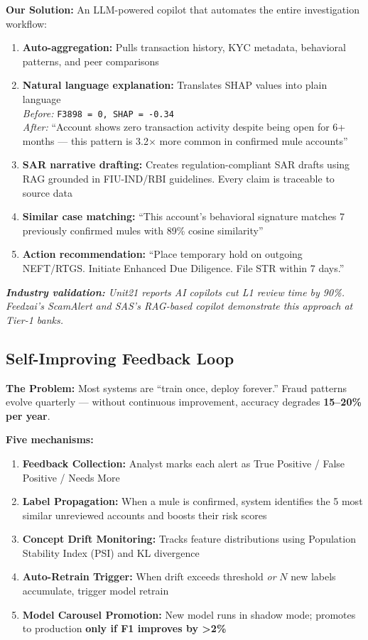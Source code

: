 \documentclass[11pt, a4paper]{article}
\begin{document}
\textbf{Our Solution:} An LLM-powered copilot that automates the entire investigation workflow:

\begin{enumerate}
    \item \textbf{Auto-aggregation:} Pulls transaction history, KYC metadata, behavioral patterns, and peer comparisons
    \item \textbf{Natural language explanation:} Translates SHAP values into plain language\\
    \textit{Before:} \texttt{F3898 = 0, SHAP = -0.34}\\
    \textit{After:} ``Account shows zero transaction activity despite being open for 6+ months --- this pattern is 3.2$\times$ more common in confirmed mule accounts''
    \item \textbf{SAR narrative drafting:} Creates regulation-compliant SAR drafts using RAG grounded in FIU-IND/RBI guidelines. Every claim is traceable to source data
    \item \textbf{Similar case matching:} ``This account's behavioral signature matches 7 previously confirmed mules with 89\% cosine similarity''
    \item \textbf{Action recommendation:} ``Place temporary hold on outgoing NEFT/RTGS. Initiate Enhanced Due Diligence. File STR within 7 days.''
\end{enumerate}

\noindent\textit{\textbf{Industry validation:} Unit21 reports AI copilots cut L1 review time by 90\%. Feedzai's ScamAlert and SAS's RAG-based copilot demonstrate this approach at Tier-1 banks.}


\subsection{Self-Improving Feedback Loop}

\textbf{The Problem:} Most systems are ``train once, deploy forever.'' Fraud patterns evolve quarterly --- without continuous improvement, accuracy degrades \textbf{15--20\% per year}.

\textbf{Five mechanisms:}

\begin{enumerate}
    \item \textbf{Feedback Collection:} Analyst marks each alert as True Positive / False Positive / Needs More
    \item \textbf{Label Propagation:} When a mule is confirmed, system identifies the 5 most similar unreviewed accounts and boosts their risk scores
    \item \textbf{Concept Drift Monitoring:} Tracks feature distributions using Population Stability Index (PSI) and KL divergence
    \item \textbf{Auto-Retrain Trigger:} When drift exceeds threshold \textit{or} $N$ new labels accumulate, trigger model retrain
    \item \textbf{Model Carousel Promotion:} New model runs in shadow mode; promotes to production \textbf{only if F1 improves by {>}2\%}
\end{enumerate}
\end{document}
